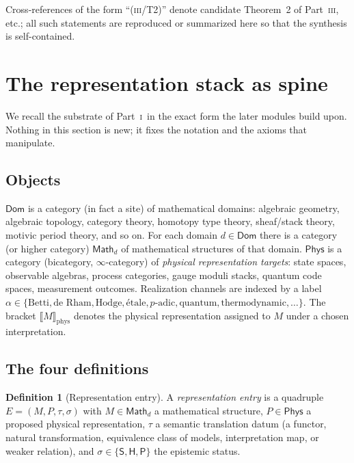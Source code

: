 \documentclass[12pt]{article}
\theoremstyle{definition}
\newtheorem{definition}[theorem]{Definition}
\theoremstyle{remark}
\newcommand{\Dom}{\mathsf{Dom}}
\newcommand{\Math}{\mathsf{Math}}
\newcommand{\Phys}{\mathsf{Phys}}
\newcommand{\physrep}[1]{\llbracket #1 \rrbracket_{\mathrm{phys}}}
\newcommand{\Sstat}{\textsf{S}}
\newcommand{\Hstat}{\textsf{H}}
\newcommand{\Pstat}{\textsf{P}}
\newcommand{\PI}{\textsc{i}}
\newcommand{\PIII}{\textsc{iii}}
\begin{document}
Cross-references of the form ``(\PIII/T2)'' denote candidate Theorem~2 of Part~\PIII,
etc.; all such statements are reproduced or summarized here so that the synthesis is
self-contained.

\section{The representation stack as spine}
\label{sec:spine}

We recall the substrate of Part~\PI\ in the exact form the later modules build upon.
Nothing in this section is new; it fixes the notation and the axioms that
 manipulate.

\subsection{Objects}

$\Dom$ is a category (in fact a site) of mathematical domains: algebraic geometry,
algebraic topology, category theory, homotopy type theory, sheaf/stack theory,
motivic period theory, and so on.  For each domain $d\in\Dom$ there is a category (or
higher category) $\Math_d$ of mathematical structures of that domain.  $\Phys$ is a
category (bicategory, $\infty$-category) of \emph{physical representation targets}:
state spaces, observable algebras, process categories, gauge moduli stacks, quantum
code spaces, measurement outcomes.  Realization channels are indexed by a label
$\alpha\in\{\text{Betti},\text{de Rham},\text{Hodge},\text{\'etale},p\text{-adic},
\text{quantum},\text{thermodynamic},\dots\}$.  The bracket $\physrep{M}$ denotes the
physical representation assigned to $M$ under a chosen interpretation.

\subsection{The four definitions}

\begin{definition}[Representation entry]
\label{def:entry}
A \emph{representation entry} is a quadruple $E=(M,P,\tau,\sigma)$ with
$M\in\Math_d$ a mathematical structure, $P\in\Phys$ a proposed physical
representation, $\tau$ a semantic translation datum (a functor, natural
transformation, equivalence class of models, interpretation map, or weaker
relation), and $\sigma\in\{\Sstat,\Hstat,\Pstat\}$ the epistemic status.
\end{definition}
\end{document}
